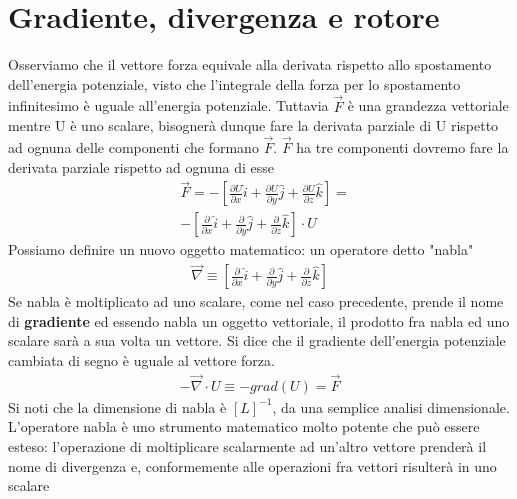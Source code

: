 \section{Gradiente, divergenza e rotore}
Osserviamo che il vettore forza equivale alla derivata rispetto allo spostamento dell'energia potenziale, visto che l'integrale della forza per lo spostamento infinitesimo è uguale all'energia potenziale. Tuttavia $\vec{F}$ è una grandezza vettoriale mentre U è uno scalare, bisognerà dunque fare la derivata parziale di U rispetto ad ognuna delle componenti che formano $\vec{F}$.  $\vec{F}$ ha tre componenti dovremo fare la derivata parziale rispetto ad ognuna di esse
\begin{align*}
	&\vec{F} = -[\frac{\partial U}{\partial x} \hat{i}+\frac{\partial U}{\partial y} \hat{j}+\frac{\partial U}{\partial z} \hat{k} ] =\\
	&-[\frac{\partial }{\partial x} \hat{i}+\frac{\partial }{\partial y} \hat{j}+\frac{\partial }{\partial z} \hat{k} ]\cdot U
\end{align*}
Possiamo definire un nuovo oggetto matematico: un operatore detto "nabla"
\begin{align*}
	\vec{\nabla} \equiv [\frac{\partial }{\partial x} \hat{i}+\frac{\partial }{\partial y} \hat{j}+\frac{\partial }{\partial z} \hat{k} ]
\end{align*}
Se nabla è moltiplicato ad uno scalare, come nel caso precedente, prende il nome di \textbf{gradiente} ed essendo nabla un oggetto vettoriale, il prodotto fra nabla ed uno scalare sarà a sua volta un vettore. Si dice che il gradiente dell'energia potenziale cambiata di segno è uguale al vettore forza.
\begin{align*}
	-\vec{\nabla} \cdot U \equiv -grad(U) = \vec{F}
\end{align*}
Si noti che la dimensione di nabla è $[L]^{-1}$, da una semplice analisi dimensionale. 
L'operatore nabla è uno strumento matematico molto potente che può essere esteso: l'operazione di moltiplicare scalarmente ad un'altro vettore prenderà il nome di divergenza e, conformemente alle operazioni fra vettori risulterà in uno scalare

